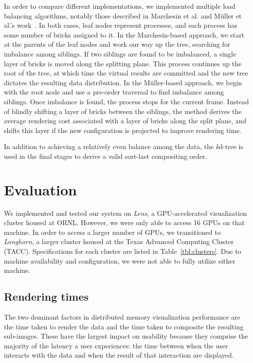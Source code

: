 In order to compare different implementations, we implemented multiple
load balancing algorithms, notably those described in Marchesin et al.
and M\"uller et al.'s work~\cite{Marchesin:2006:???, MSE06}.  In both cases, leaf
nodes represent processes, and each process has some number of bricks
assigned to it.  In the Marchesin-based approach, we start at the
parents of the leaf nodes and work our way up the tree, searching for
imbalance among siblings.  If two siblings are found to be imbalanced,
a single layer of bricks is moved along the splitting plane.  This
process continues up the root of the tree, at which time the virtual
results are committed and the new tree dictates the resulting data
distribution.  In the M\"uller-based approach, we begin with the root
node and use a pre-order traversal to find imbalance among siblings.
Once imbalance is found, the process stops for the current frame.
Instead of blindly shifting a layer of bricks between the siblings,
the method derives the average rendering cost associated with a layer
of bricks along the split plane, and shifts this layer if the new
configuration is projected to improve rendering time.

In addition to achieving a relatively even balance among the data, the
\emph{k}d-tree is used in the final stages to derive a valid sort-last
compositing order.

\section{Evaluation}
\label{sec:eval}


We implemented and tested our system on \textit{Lens}, a GPU-accelerated
visualization cluster housed at ORNL.  However, we were only able to access 16
GPUs on that machine.  In order to access a larger number of GPUs, we
transitioned to \textit{Longhorn}, a larger cluster housed at the Texas
Advanced Computing Cluster (TACC).  Specifications for each cluster are listed
in Table~\ref{tbl:clusters}.  Due to machine availability and configuration, we
were not able to fully utilize either machine.

\subsection{Rendering times}

The two dominant factors in distributed memory visualization
performance are the time taken to render the data and the time taken
to composite the resulting sub-images.  These have the largest impact
on usability because they comprise the majority of the latency a user
experiences: the time between when the user interacts with the data and
when the result of that interaction are displayed.

